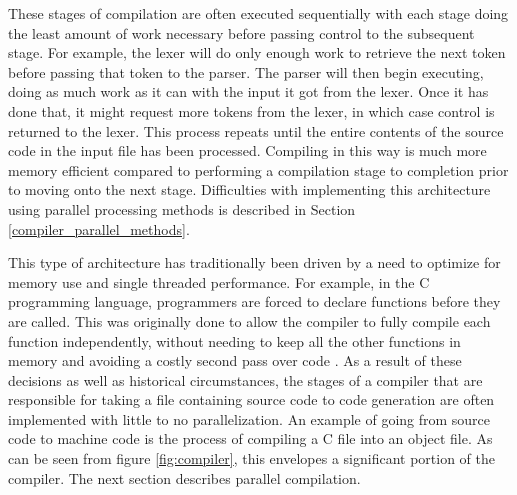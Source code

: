 These stages of compilation are often executed sequentially with each stage
doing the least amount of work necessary before passing control to the
subsequent stage. For example, the lexer will do only enough work to retrieve
the next token before passing that token to the parser. The parser will then
begin executing, doing as much work as it can with the input it got from the
lexer. Once it has done that, it might request more tokens from the lexer,
in which case control is returned to the lexer. This process repeats until
the entire contents of the source code in the input file has been processed.
Compiling in this way is much more memory efficient compared to performing
a compilation stage to completion prior to moving onto the next stage.
Difficulties with implementing this architecture using parallel processing
methods is described in Section \ref{compiler_parallel_methods}.

This type of architecture has traditionally been driven by a need to
optimize for memory use and single threaded performance. For example, in
the C programming language, programmers are forced to declare functions
before they are called. This was originally done to allow the compiler
to fully compile each function independently, without needing to keep all
the other functions in memory and avoiding a costly second pass over code
\cite{scott_programming_2015}. As a result of these decisions as well as
historical circumstances, the stages of a compiler that are responsible  for
taking a file containing source code to code generation are often implemented
with little to no parallelization. An example of going from source code to
machine code is the process of compiling a C file into an object file. As can be
seen from figure \ref{fig:compiler}, this envelopes a significant portion of the
compiler. The next section describes parallel compilation.


